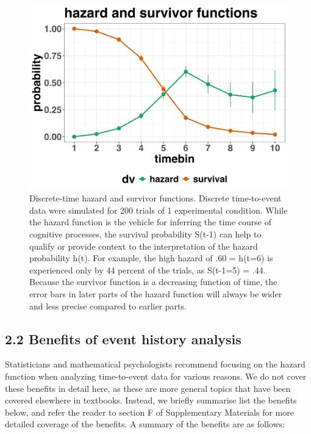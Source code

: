 \documentclass[
  man, donotrepeattitle,floatsintext]{apa6}
\begin{document}
\begin{figure}[H]

{\centering \includegraphics[width=0.8\linewidth,height=0.67\textheight,]{../sims/figures/haz_surv_single} 

}

\caption{Discrete-time hazard and survivor functions. Discrete time-to-event data were simulated for 200 trials of 1 experimental condition. While the hazard function is the vehicle for inferring the time course of cognitive processes, the survival probability S(t-1) can help to qualify or provide context to the interpretation of the hazard probability h(t). For example, the high hazard of .60 = h(t=6) is experienced only by 44 percent of the trials, as S(t-1=5) = .44.
Because the survivor function is a decreasing function of time, the error bars in later parts of the hazard function will always be wider and less precise compared to earlier parts.}\label{fig:plot2}
\end{figure}

\subsection{2.2 Benefits of event history analysis}\label{benefits-of-event-history-analysis}

Statisticians and mathematical psychologists recommend focusing on the hazard function when analyzing time-to-event data for various reasons. We do not cover these benefits in detail here, as these are more general topics that have been covered elsewhere in textbooks. Instead, we briefly summarise list the benefits below, and refer the reader to section F of Supplementary Materials for more detailed coverage of the benefits. A summary of the benefits are as follows:
\end{document}
